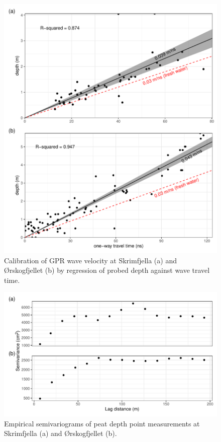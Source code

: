 \documentclass[soil, manuscript]{copernicus}
\begin{document}
\begin{figure}[ht]
\centering
\includegraphics[height=0.7\textheight]{figures/GPRwavevelocity.pdf}
\caption{\label{fig:GPRwavevelocity}Calibration of GPR wave velocity at Skrimfjella (a) and Ørskogfjellet (b) by regression of probed depth against wave travel time.}
\end{figure}

\begin{figure}[ht]
\centering
\includegraphics{figures/semivariograms.pdf}
\caption{\label{fig:semivariograms}Empirical semivariograms of peat depth point measurements at Skrimfjella (a) and Ørskogfjellet (b).}
\end{figure}
\clearpage
\end{document}

